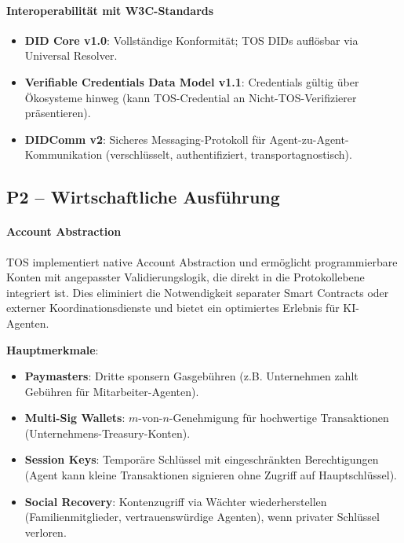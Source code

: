 \documentclass[11pt]{article}
\begin{document}
\paragraph{Interoperabilität mit W3C-Standards}
\begin{itemize}[noitemsep]
  \item \textbf{DID Core v1.0}: Vollständige Konformität; TOS DIDs auflösbar via Universal Resolver.
  \item \textbf{Verifiable Credentials Data Model v1.1}: Credentials gültig über Ökosysteme hinweg (kann TOS-Credential an Nicht-TOS-Verifizierer präsentieren).
  \item \textbf{DIDComm v2}: Sicheres Messaging-Protokoll für Agent-zu-Agent-Kommunikation (verschlüsselt, authentifiziert, transportagnostisch).
\end{itemize}

\subsection{P2 -- Wirtschaftliche Ausführung}
\label{sec:pillar-economic}

\paragraph{Account Abstraction}
TOS implementiert native Account Abstraction und ermöglicht programmierbare Konten mit angepasster Validierungslogik, die direkt in die Protokollebene integriert ist. Dies eliminiert die Notwendigkeit separater Smart Contracts oder externer Koordinationsdienste und bietet ein optimiertes Erlebnis für KI-Agenten.

\textbf{Hauptmerkmale}:
\begin{itemize}[noitemsep]
  \item \textbf{Paymasters}: Dritte sponsern Gasgebühren (z.B. Unternehmen zahlt Gebühren für Mitarbeiter-Agenten).
  \item \textbf{Multi-Sig Wallets}: $m$-von-$n$-Genehmigung für hochwertige Transaktionen (Unternehmens-Treasury-Konten).
  \item \textbf{Session Keys}: Temporäre Schlüssel mit eingeschränkten Berechtigungen (Agent kann kleine Transaktionen signieren ohne Zugriff auf Hauptschlüssel).
  \item \textbf{Social Recovery}: Kontenzugriff via Wächter wiederherstellen (Familienmitglieder, vertrauenswürdige Agenten), wenn privater Schlüssel verloren.
\end{itemize}
\end{document}
